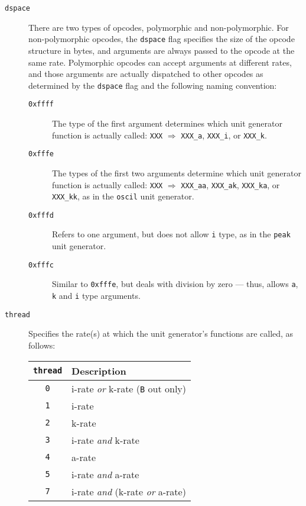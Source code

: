 \documentclass[10pt,letterpaper,onecolumn]{book}
\begin{document}
\begin{description}  
	\item[\texttt{dspace}] There are two types of opcodes, polymorphic and non-polymorphic. For non-polymorphic opcodes, the \texttt{dspace} flag specifies the size of the opcode structure in bytes, and arguments are always passed to the opcode at the same rate. Polymorphic opcodes can accept arguments at different rates, and those arguments are actually dispatched to other opcodes as determined by the \texttt{dspace} flag and the following naming convention:

	\begin{description}
		\item[\texttt{0xffff}] The type of the first argument determines which unit generator function is actually called: \texttt{XXX} $\Longrightarrow$ \texttt{XXX\_a}, \texttt{XXX\_i}, or \texttt{XXX\_k}.
		\item[\texttt{0xfffe}] The types of the first two arguments determine which unit generator function is actually called:  \texttt{XXX} $\Longrightarrow$ \texttt{XXX\_aa}, \texttt{XXX\_ak}, \texttt{XXX\_ka}, or \texttt{XXX\_kk}, as in the \texttt{oscil} unit generator.
		\item[\texttt{0xfffd}] Refers to one argument, but does not allow \texttt{i} type, as in the \texttt{peak} unit generator.
		\item[\texttt{0xfffc}] Similar to \texttt{0xfffe}, but deals with division by zero --- thus, allows \texttt{a}, \texttt{k} and \texttt{i} type arguments.
	\end{description}

	\item[\texttt{thread}] Specifies the rate(s) at which the unit generator's functions are called, as follows:
	
			\begin{center}
			\begin{tabular*}{280pt}[t]{cl}
			\texttt{thread} & Description \\
			\hline
			\texttt{0} & i-rate \emph{or} k-rate (\texttt{B} out only) \\
			\texttt{1} & i-rate \\
			\texttt{2} & k-rate \\
			\texttt{3} & i-rate \emph{and} k-rate\\
			\texttt{4} & a-rate \\
			\texttt{5} & i-rate \emph{and} a-rate \\
			\texttt{7} & i-rate \emph{and} (k-rate \emph{or} a-rate) \\
			\end{tabular*}
			\end{center}
	

\end{description}
\end{document}
